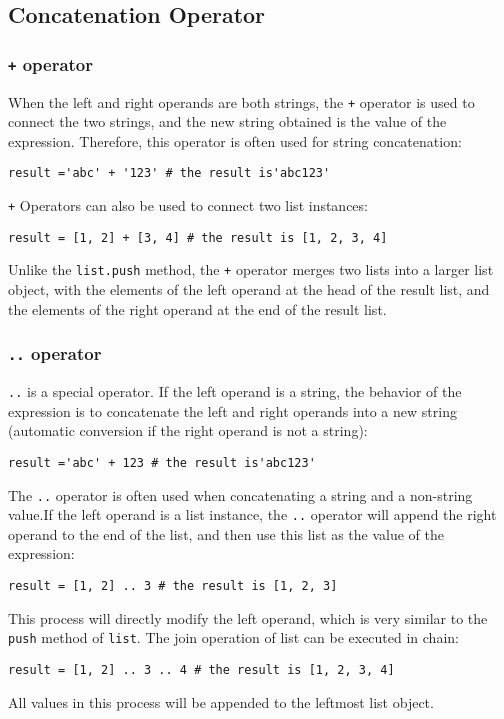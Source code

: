 \subsection {Concatenation Operator}

\subsubsection{\texttt{+} operator}

When the left and right operands are both strings, the \texttt{+} operator is used to connect the two strings, and the new string obtained is the value of the expression. Therefore, this operator is often used for string concatenation:
\begin{lstlisting}[language=berry, numbers=none]
result ='abc' + '123' # the result is'abc123'
\end{lstlisting}

\texttt{+} Operators can also be used to connect two list instances:
\begin{lstlisting}[language=berry, numbers=none]
result = [1, 2] + [3, 4] # the result is [1, 2, 3, 4]
\end{lstlisting}
Unlike the \texttt{list.push} method, the \texttt{+} operator merges two lists into a larger list object, with the elements of the left operand at the head of the result list, and the elements of the right operand at the end of the result list.

\subsubsection{\texttt{..} operator}

\texttt{..} is a special operator. If the left operand is a string, the behavior of the expression is to concatenate the left and right operands into a new string (automatic conversion if the right operand is not a string):
\begin{lstlisting}[language=berry, numbers=none]
result ='abc' + 123 # the result is'abc123'
\end{lstlisting}
The \texttt{..} operator is often used when concatenating a string and a non-string value.If the left operand is a list instance, the \texttt{..} operator will append the right operand to the end of the list, and then use this list as the value of the expression:
\begin{lstlisting}[language=berry, numbers=none]
result = [1, 2] .. 3 # the result is [1, 2, 3]
\end{lstlisting}
This process will directly modify the left operand, which is very similar to the \texttt{push} method of \texttt{list}. The join operation of list can be executed in chain:
\begin{lstlisting}[language=berry, numbers=none]
result = [1, 2] .. 3 .. 4 # the result is [1, 2, 3, 4]
\end{lstlisting}
All values   in this process will be appended to the leftmost list object.

